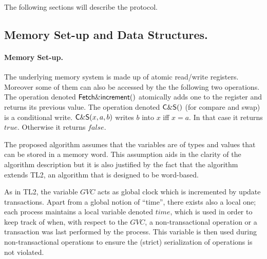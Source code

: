 The following sections will describe the protocol.
\subsection{Memory Set-up and Data Structures.}


\paragraph{Memory Set-up.}
The underlying memory system is made up of atomic read/write registers. 
Moreover some of them can also be accessed by the the following two 
operations. The operation denoted 
${\sf Fetch\&increment}()$ atomically adds one to the register and 
returns its previous value. 
 The operation denoted 
${\sf C\&S}()$ (for compare and swap) is a conditional write. 
${\sf C\&S}(x,a,b)$ writes $b$ into $x$ iff $x=a$. In that case it 
returns $\mathit{true}$. Otherwise it returns  $\mathit{false}$. 


The proposed algorithm assumes that the
variables  are  of  types and  values  that  can  be   stored in  a  memory
word. This assumption aids in the clarity of the algorithm description  
but it  is also  justified by the  fact that  the algorithm extends  TL2, an
algorithm that is   designed to be word-based. 

As in TL2,  the variable $\mathit{GVC}$
acts as  global  clock  which  is incremented  by update transactions.
 Apart from a global   notion of ``time'', there exists also
a local one; each process maintains a local  
variable denoted $\mathit{time}$,  which is used in order to keep  
track of when, with
respect to the $\mathit{GVC}$, a non-transactional operation 
or a transaction was last performed by
the  process.
This variable is then used during non-transactional operations to ensure
the (strict) serialization of operations is not violated.

